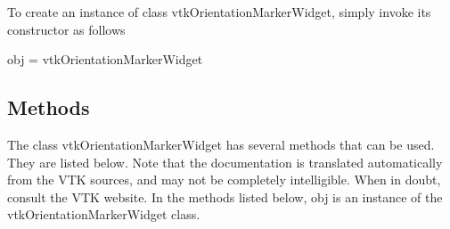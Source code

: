 To create an instance of class vtk\-Orientation\-Marker\-Widget, simply invoke its constructor as follows \begin{DoxyVerb}  obj = vtkOrientationMarkerWidget
\end{DoxyVerb}
 \hypertarget{vtkwidgets_vtkxyplotwidget_Methods}{}\subsection{Methods}\label{vtkwidgets_vtkxyplotwidget_Methods}
The class vtk\-Orientation\-Marker\-Widget has several methods that can be used. They are listed below. Note that the documentation is translated automatically from the V\-T\-K sources, and may not be completely intelligible. When in doubt, consult the V\-T\-K website. In the methods listed below, {\ttfamily obj} is an instance of the vtk\-Orientation\-Marker\-Widget class. 
